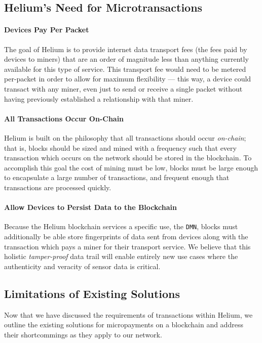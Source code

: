 \documentclass[10pt, nonatbib, nocopyrightspace, reprint]{sigplanconf}
\begin{document}
\subsection{Helium's Need for Microtransactions}

\paragraph{Devices Pay Per Packet}
The goal of Helium is to provide internet data transport fees (the fees paid by devices to miners) that are an order of magnitude less than anything currently available for this type of service. This transport fee would need to be metered per-packet in order to allow for maximum flexibility --- this way, a device could transact with any miner, even just to send or receive a single packet without having previously established a relationship with that miner.

\paragraph{All Transactions Occur On-Chain}
Helium is built on the philosophy that all transactions should occur \emph{on-chain}; that is, blocks should be sized and mined with a frequency such that every transaction which occurs on the network should be stored in the blockchain.  To accomplish this goal the cost of mining must be low, blocks must be large enough to encapsulate a large number of transactions, and frequent enough that transactions are processed quickly.

\paragraph{Allow Devices to Persist Data to the Blockchain}
Because the Helium blockchain services a specific use, the \verb|DMN|, blocks must additionally be able store fingerprints of data sent from devices along with the transaction which pays a miner for their transport service.  We believe that this holistic \emph{tamper-proof} data trail will enable entirely new use cases where the authenticity and veracity of sensor data is critical.

\subsection{Limitations of Existing Solutions}

Now that we have discussed the requirements of transactions within Helium, we outline the existing solutions for micropayments on a blockchain and address their shortcommings as they apply to our network.
\end{document}
